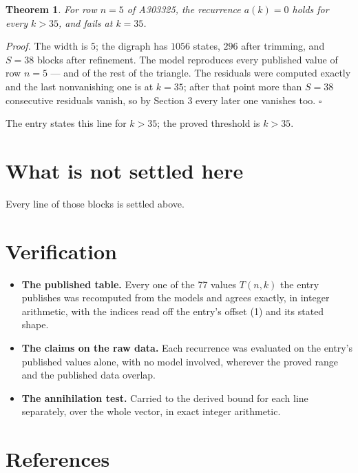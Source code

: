 \documentclass[11pt]{article}
\newtheorem{theorem}{Theorem}
\theoremstyle{definition}
\begin{document}
\begin{theorem} For row $n = 5$ of A303325, the recurrence $a(k) = 0$ holds for every $k > 35$, and fails at $k = 35$.\end{theorem}

{\itshape Proof.} The width is $5$; the digraph has $1056$ states, $296$ after trimming, and $S = 38$ blocks after refinement. The model reproduces every published value of row $n = 5$ --- and of the rest of the triangle. The residuals were computed exactly and the last nonvanishing one is at $k = 35$; after that point more than $S = 38$ consecutive residuals vanish, so by Section 3 every later one vanishes too. $\square$

The entry states this line for $k > 35$; the proved threshold is $k > 35$.

\section{What is not settled here}

Every line of those blocks is settled above.

\section{Verification}

\begin{itemize}

\item {\bfseries The published table.} Every one of the 77 values $T(n,k)$ the entry publishes was recomputed from the models and agrees exactly, in integer arithmetic, with the indices read off the entry's offset (1) and its stated shape.

\item {\bfseries The claims on the raw data.} Each recurrence was evaluated on the entry's published values alone, with no model involved, wherever the proved range and the published data overlap.

\item {\bfseries The annihilation test.} Carried to the derived bound for each line separately, over the whole vector, in exact integer arithmetic.

\end{itemize}

\section{References}
\end{document}
